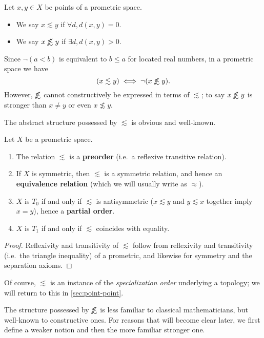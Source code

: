 \documentclass{article}
\def\oapt{\mathrel{\!\not\,\not\lesssim}}
\def\leapx{\lesssim}
\begin{document}
\begin{defn}\label{def:promet-ord}
  Let $x,y\in X$ be points of a prometric space.
  \begin{itemize}
  \item We say $x\leapx y$ if $\forall d, d(x,y)=0$.
  \item We say $x\oapt y$ if $\exists d, d(x,y)>0$.
  \end{itemize}
\end{defn}

Since $\neg(a<b)$ is equivalent to $b\le a$ for located real numbers, in a prometric space we have
\begin{equation}
  (x\leapx y) \iff \neg(x\oapt y).\label{eq:leapx-oapt}
\end{equation}
However, $\oapt$ cannot constructively be expressed in terms of $\leapx$; to say $x\oapt y$ is stronger than $x\neq y$ or even $x\not\leapx y$.

The abstract structure possessed by $\leapx$ is obvious and well-known.

\begin{thm}\label{thm:pmet-preord}
  Let $X$ be a prometric space.
  \begin{enumerate}
  \item The relation $\leapx$ is a \textbf{preorder} (i.e.\ a reflexive transitive relation).
  \item If $X$ is symmetric, then $\leapx$ is a symmetric relation, and hence an \textbf{equivalence relation} (which we will usually write as $\approx$).
  \item $X$ is $T_0$ if and only if $\leapx$ is antisymmetric ($x\leapx y$ and $y\leapx x$ together imply $x=y$), hence a \textbf{partial order}.
  \item $X$ is $T_1$ if and only if $\leapx$ coincides with equality.
  \end{enumerate}
\end{thm}
\begin{proof}
  Reflexivity and transitivity of $\leapx$ follow from reflexivity and transitivity (i.e.\ the triangle inequality) of a prometric, and likewise for symmetry and the separation axioms.
\end{proof}

Of course, $\leapx$ is an instance of the \emph{specialization order} underlying a topology; we will return to this in \cref{sec:point-point}.

The structure possessed by $\oapt$ is less familiar to classical mathematicians, but well-known to constructive ones.  
For reasons that will become clear later, we first define a weaker notion and then the more familiar stronger one.
\end{document}
